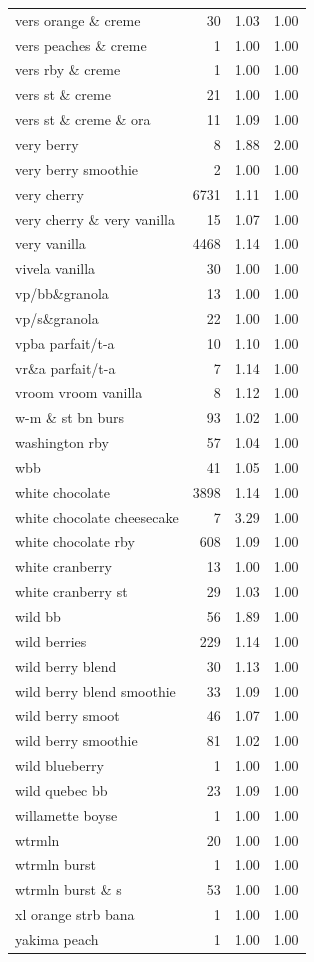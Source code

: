 \begin{table}
\begin{tabular}{lrrr}
vers orange \& creme & 30 & 1.03 & 1.00 \\
vers peaches \& creme & 1 & 1.00 & 1.00 \\
vers rby \& creme & 1 & 1.00 & 1.00 \\
vers st \& creme & 21 & 1.00 & 1.00 \\
vers st \& creme \& ora & 11 & 1.09 & 1.00 \\
very berry & 8 & 1.88 & 2.00 \\
very berry smoothie & 2 & 1.00 & 1.00 \\
very cherry & 6731 & 1.11 & 1.00 \\
very cherry \& very vanilla & 15 & 1.07 & 1.00 \\
very vanilla & 4468 & 1.14 & 1.00 \\
vivela vanilla & 30 & 1.00 & 1.00 \\
vp/bb\&granola & 13 & 1.00 & 1.00 \\
vp/s\&granola & 22 & 1.00 & 1.00 \\
vpba parfait/t-a & 10 & 1.10 & 1.00 \\
vr\&a parfait/t-a & 7 & 1.14 & 1.00 \\
vroom vroom vanilla & 8 & 1.12 & 1.00 \\
w-m \& st bn burs & 93 & 1.02 & 1.00 \\
washington rby & 57 & 1.04 & 1.00 \\
wbb & 41 & 1.05 & 1.00 \\
white chocolate & 3898 & 1.14 & 1.00 \\
white chocolate cheesecake & 7 & 3.29 & 1.00 \\
white chocolate rby & 608 & 1.09 & 1.00 \\
white cranberry & 13 & 1.00 & 1.00 \\
white cranberry st & 29 & 1.03 & 1.00 \\
wild bb & 56 & 1.89 & 1.00 \\
wild berries & 229 & 1.14 & 1.00 \\
wild berry blend & 30 & 1.13 & 1.00 \\
wild berry blend smoothie & 33 & 1.09 & 1.00 \\
wild berry smoot & 46 & 1.07 & 1.00 \\
wild berry smoothie & 81 & 1.02 & 1.00 \\
wild blueberry & 1 & 1.00 & 1.00 \\
wild quebec bb & 23 & 1.09 & 1.00 \\
willamette boyse & 1 & 1.00 & 1.00 \\
wtrmln & 20 & 1.00 & 1.00 \\
wtrmln burst & 1 & 1.00 & 1.00 \\
wtrmln burst \& s & 53 & 1.00 & 1.00 \\
xl orange strb bana & 1 & 1.00 & 1.00 \\
yakima peach & 1 & 1.00 & 1.00 \\
\bottomrule
\end{tabular}
\end{table}

